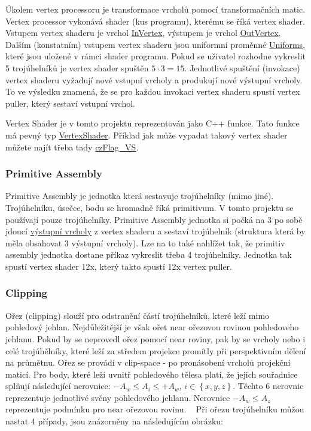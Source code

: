 Úkolem vertex processoru je transformace vrcholů pomocí transformačních matic. Vertex processor vykonává shader (kus programu), kterému se říká vertex shader. Vstupem vertex shaderu je vrchol \hyperlink{structInVertex}{In\+Vertex}, výstupem je vrchol \hyperlink{structOutVertex}{Out\+Vertex}. Dalším (konstatním) vstupem vertex shaderu jsou uniformní proměnné \hyperlink{structUniforms}{Uniforms}, které jsou uložené v rámci shader programu. Pokud se uživatel rozhodne vykreslit 5 trojúhelníků je vertex shader spuštěn $ 5 \cdot 3 = 15 $. Jednotlivé spuštění (invokace) vertex shaderu vyžadují nové vstupní vrcholy a produkují nové výstupní vrcholy. To ve výsledku znamená, že se pro každou invokaci vertex shaderu spustí vertex puller, který sestaví vstupní vrchol. 

Vertex Shader je v tomto projektu reprezentován jako C++ funkce. Tato funkce má pevný typ \hyperlink{fwd_8hpp_af647cdb302d7e978c6a0da41a0a92725}{Vertex\+Shader}. Příklad jak může vypadat takový vertex shader můžete najít třeba tady \hyperlink{czFlagMethod_8cpp_a787e2577e9bc9e3a1d683e567222c827}{cz\+Flag\+\_\+\+VS}.\hypertarget{index_PrimitiveAssembly}{}\subsubsection{Primitive Assembly}\label{index_PrimitiveAssembly}
Primitive Assembly je jednotka která sestavuje trojúhelníky (mimo jiné). Trojúhelníku, úsečce, bodu se hromadně říká primitivum. V tomto projektu se používají pouze trojúhelníky. Primitive Assembly jednotka si počká na 3 po sobě jdoucí \hyperlink{structOutVertex}{výstupní vrcholy} z vertex shaderu a sestaví trojúhelník (struktura která by měla obsahovat 3 výstupní vrcholy). Lze na to také nahlížet tak, že primitiv assembly jednotka dostane příkaz vykreslit třeba 4 trojúhelníky. Jednotka tak spustí vertex shader 12x, který takto spustí 12x vertex puller.

\hypertarget{index_Clipping}{}\subsubsection{Clipping}\label{index_Clipping}
Ořez (clipping) slouží pro odstranění částí trojúhelníků, které leží mimo pohledový jehlan. Nejdůležitější je však ořet near ořezovou rovinou pohledoveho jehlanu. Pokud by se neprovedl ořez pomocí near roviny, pak by se vrcholy nebo i celé trojúhělníky, které leží za středem projekce promítly při perspektivním dělení na průmětnu. Ořez se provádí v clip-\/space -\/ po pronásobení vrcholů projekční maticí. Pro body, které leží uvnitř pohledového tělesa platí, že jejich souřadnice splňují následující nerovnice\+: $ -A_w \leq A_i \leq +A_w $, $i \in \left\{ x,y,z \right\}$. Těchto 6 nerovnic reprezentuje jednotlivé svěny pohledového jehlanu. Nerovnice $ -A_w \leq A_z $ reprezentuje podmínku pro near ořezovou rovinu. ~\newline
 Při ořezu trojúhelníku můžou nastat 4 případy, jsou znázorněny na následujícím obrázku\+:

